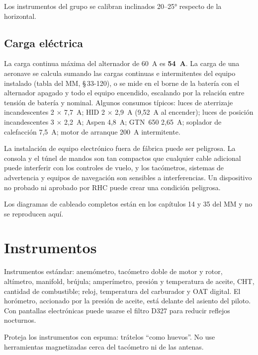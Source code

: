 Los instrumentos del grupo se calibran inclinados 20--25° respecto de la horizontal.

\subsection{Carga eléctrica}

La carga continua máxima del alternador de 60~A es \textbf{54~A}. La carga de una aeronave se calcula sumando las cargas continuas e intermitentes del equipo instalado (tabla del MM, \S\,33-120), o se mide en el borne de la batería con el alternador apagado y todo el equipo encendido, escalando por la relación entre tensión de batería y nominal. Algunos consumos típicos: luces de aterrizaje incandescentes 2 $\times$ 7,7~A; HID 2 $\times$ 2,9~A (9,52~A al encender); luces de posición incandescentes 3 $\times$ 2,2~A; Aspen 4,8~A; GTN~650 2,65~A; soplador de calefacción 7,5~A; motor de arranque 200~A intermitente.

\begin{advertencia}
La instalación de equipo electrónico fuera de fábrica puede ser peligrosa. La consola y el túnel de mandos son tan compactos que cualquier cable adicional puede interferir con los controles de vuelo, y los tacómetros, sistemas de advertencia y equipos de navegación son sensibles a interferencias. Un dispositivo no probado ni aprobado por RHC puede crear una condición peligrosa.
\end{advertencia}

Los diagramas de cableado completos están en los capítulos 14 y 35 del MM y no se reproducen aquí.

\section{Instrumentos}

Instrumentos estándar: anemómetro, tacómetro doble de motor y rotor, altímetro, manifold, brújula; amperímetro, presión y temperatura de aceite, CHT, cantidad de combustible; reloj, temperatura del carburador y OAT digital. El horómetro, accionado por la presión de aceite, está delante del asiento del piloto. Con pantallas electrónicas puede usarse el filtro D327 para reducir reflejos nocturnos.

\begin{precaucion}
Proteja los instrumentos con espuma: trátelos ``como huevos''. No use herramientas magnetizadas cerca del tacómetro ni de las antenas.
\end{precaucion}

